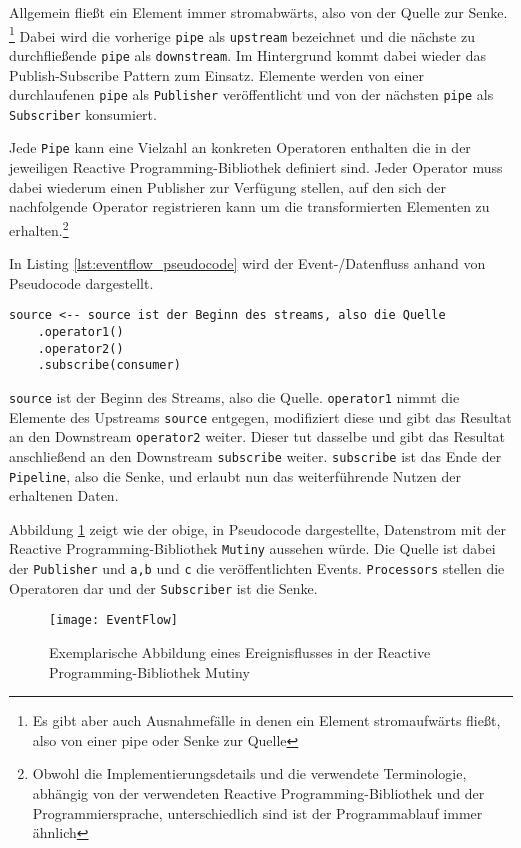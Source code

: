 Allgemein fließt ein Element immer stromabwärts, also von der Quelle zur Senke.
\footnote{Es gibt aber auch Ausnahmefälle in denen ein Element stromaufwärts fließt, also von einer pipe oder Senke zur Quelle}
Dabei wird die vorherige \verb|pipe| als \verb|upstream| bezeichnet und die nächste zu durchfließende \verb|pipe| als \verb|downstream|.
Im Hintergrund kommt dabei wieder das Publish-Subscribe Pattern zum Einsatz. Elemente werden von einer durchlaufenen \verb|pipe| als \verb|Publisher|
veröffentlicht und von der nächsten \verb|pipe| als \verb|Subscriber| konsumiert.

Jede \verb|Pipe| kann eine Vielzahl an konkreten Operatoren enthalten die in der jeweiligen Reactive Programming-Bibliothek definiert sind.
Jeder Operator muss dabei wiederum einen Publisher zur Verfügung stellen, auf den sich der nachfolgende Operator registrieren kann
um die transformierten Elementen zu erhalten.\footnote{Obwohl die Implementierungsdetails und die verwendete Terminologie, abhängig von der verwendeten Reactive Programming-Bibliothek
  und der Programmiersprache, unterschiedlich sind ist der Programmablauf immer ähnlich}

In Listing \ref{lst:eventflow_pseudocode} wird der Event-/Datenfluss anhand von Pseudocode dargestellt.
\begin{lstlisting}[caption=Pseudocode Event-/Datenfluss, captionpos=b, label=lst:eventflow_pseudocode]
source <-- source ist der Beginn des streams, also die Quelle
	.operator1() 
	.operator2() 
	.subscribe(consumer)
\end{lstlisting}
\verb|source| ist der Beginn des Streams, also die Quelle. \verb|operator1| nimmt die Elemente des Upstreams \verb|source| entgegen,
modifiziert diese und gibt das Resultat an den Downstream \verb|operator2| weiter.
Dieser tut dasselbe und gibt das Resultat anschließend an den Downstream \verb|subscribe| weiter.
\verb|subscribe| ist das Ende der \verb|Pipeline|, also die Senke, und erlaubt nun das weiterführende Nutzen der erhaltenen Daten.

Abbildung \ref{fig:eventflow_mutiny} zeigt wie der obige, in Pseudocode dargestellte, Datenstrom
mit der Reactive Programming-Bibliothek \verb|Mutiny| aussehen würde.
Die Quelle ist dabei der \verb|Publisher| und \verb|a,b| und \verb|c| die veröffentlichten Events.
\verb|Processors| stellen die Operatoren dar und der \verb|Subscriber| ist die Senke.

\begin{figure}[ht!]
  \centering
  \texttt{[image: EventFlow]}
  \caption{Exemplarische Abbildung eines Ereignisflusses in der Reactive Programming-Bibliothek Mutiny \parencite{MutinyEventFlow}}
  \label{fig:eventflow_mutiny}
\end{figure}

